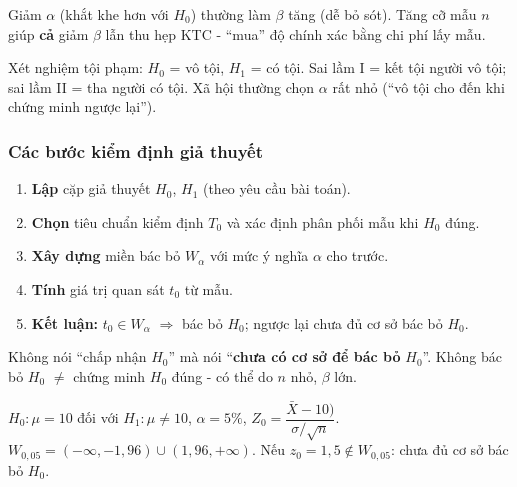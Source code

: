 \documentclass[12pt,a4paper]{article}
\begin{document}
\begin{luuy}[title={Đánh đổi $\alpha$ và $\beta$}]
Giảm $\alpha$ (khắt khe hơn với $H_0$) thường làm $\beta$ tăng (dễ bỏ sót). Tăng cỡ mẫu $n$ giúp \textbf{cả} giảm $\beta$ lẫn thu hẹp KTC - ``mua'' độ chính xác bằng chi phí lấy mẫu.
\end{luuy}

\begin{vidu}[title={Ví dụ tư pháp - $\alpha$ và $\beta$}]
Xét nghiệm tội phạm: $H_0$ = vô tội, $H_1$ = có tội. Sai lầm I = kết tội người vô tội; sai lầm II = tha người có tội. Xã hội thường chọn $\alpha$ rất nhỏ (``vô tội cho đến khi chứng minh ngược lại'').
\end{vidu}

\subsubsection{Các bước kiểm định giả thuyết}

\begin{phuongphap}[title={Quy trình 5 bước}]
\begin{enumerate}
  \item \textbf{Lập} cặp giả thuyết $H_0$, $H_1$ (theo yêu cầu bài toán).
  \item \textbf{Chọn} tiêu chuẩn kiểm định $T_0$ và xác định phân phối mẫu khi $H_0$ đúng.
  \item \textbf{Xây dựng} miền bác bỏ $W_\alpha$ với mức ý nghĩa $\alpha$ cho trước.
  \item \textbf{Tính} giá trị quan sát $t_0$ từ mẫu.
  \item \textbf{Kết luận:} $t_0 \in W_\alpha$ $\Rightarrow$ bác bỏ $H_0$; ngược lại chưa đủ cơ sở bác bỏ $H_0$.
\end{enumerate}
\end{phuongphap}

\begin{luuy}[title={Diễn đạt kết luận đúng}]
Không nói ``chấp nhận $H_0$'' mà nói ``\textbf{chưa có cơ sở để bác bỏ} $H_0$''. Không bác bỏ $H_0$ $\not=$ chứng minh $H_0$ đúng - có thể do $n$ nhỏ, $\beta$ lớn.
\end{luuy}

\begin{vidu}[title={Kiểm định hai phía - minh họa}]
$H_0: \mu = 10$ đối với $H_1: \mu \ne 10$, $\alpha = 5\%$, $Z_0 = \dfrac{\bar{X}-10)}{\sigma/\sqrt{n}}$.
$W_{0{,}05} = (-\infty, -1{,}96) \cup (1{,}96, +\infty)$.
Nếu $z_0 = 1{,}5 \notin W_{0{,}05}$: chưa đủ cơ sở bác bỏ $H_0$.
\end{vidu}
\end{document}
